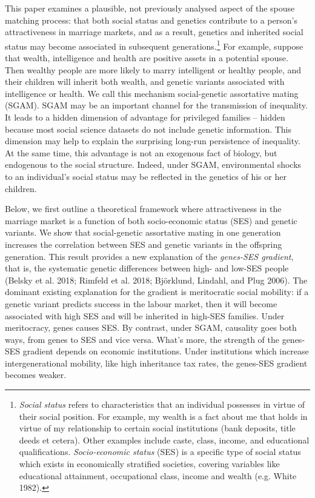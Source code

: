 \documentclass[
]{article}
\theoremstyle{definition}
\theoremstyle{definition}
\theoremstyle{definition}
\theoremstyle{definition}
\theoremstyle{remark}
\begin{document}
This paper examines a plausible, not previously analysed aspect of the spouse
matching process: that both social status and genetics contribute to a person's
attractiveness in marriage markets, and as a result, genetics and inherited
social status may become associated in subsequent generations.\footnote{\emph{Social status} refers to characteristics that an individual
  possesses in virtue of their social position. For example, my wealth
  is a fact about me that holds in virtue of my relationship to
  certain social institutions (bank deposits, title deeds et cetera).
  Other examples include caste, class, income, and educational
  qualifications. \emph{Socio-economic status} (SES) is a specific type of
  social status which exists in economically stratified societies, covering
  variables like educational attainment, occupational class, income and
  wealth (e.g. White 1982).} For
example, suppose that wealth, intelligence and health are positive assets in a
potential spouse. Then wealthy people are more likely to marry intelligent or
healthy people, and their children will inherit both wealth, and genetic
variants associated with intelligence or health. We call this mechanism
social-genetic assortative mating (SGAM). SGAM may be an important channel for
the transmission of inequality. It leads to a hidden dimension of advantage for
privileged families -- hidden because most social science datasets do not include
genetic information. This dimension may help to explain the surprising long-run
persistence of inequality. At the
same time, this advantage is not an exogenous fact of biology, but endogenous to
the social structure. Indeed, under SGAM, environmental shocks to an
individual's social status may be reflected in the genetics of his or her
children.

Below, we first outline a theoretical framework where attractiveness in the
marriage market is a function of both socio-economic status (SES) and genetic
variants. We show that social-genetic assortative mating in one generation
increases the correlation between SES and genetic variants in the offspring
generation. This result provides a new explanation of the \emph{genes-SES gradient},
that is, the systematic genetic differences between high- and low-SES people
(Belsky et al. 2018; Rimfeld et al. 2018; Björklund, Lindahl, and Plug 2006). The
dominant existing explanation for the gradient is meritocratic social mobility:
if a genetic variant predicts success in the labour market, then it will
become associated with high SES and will be inherited in high-SES families.
Under meritocracy, genes causes SES. By contrast, under SGAM,
causality goes both ways, from genes to SES and vice versa. What's more, the
strength of the genes-SES gradient depends on economic institutions. Under
institutions which increase intergenerational mobility, like high inheritance
tax rates, the genes-SES gradient becomes weaker.
\end{document}
